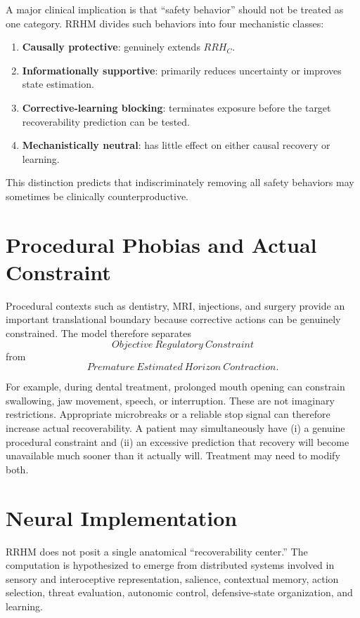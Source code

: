 \documentclass[11pt]{article}
\begin{document}
A major clinical implication is that ``safety behavior'' should not be treated as one category. RRHM divides such behaviors into four mechanistic classes:

\begin{enumerate}[label=\arabic*.]
\item \textbf{Causally protective}: genuinely extends $RRH_C$.
\item \textbf{Informationally supportive}: primarily reduces uncertainty or improves state estimation.
\item \textbf{Corrective-learning blocking}: terminates exposure before the target recoverability prediction can be tested.
\item \textbf{Mechanistically neutral}: has little effect on either causal recovery or learning.
\end{enumerate}

This distinction predicts that indiscriminately removing all safety behaviors may sometimes be clinically counterproductive.

\section{Procedural Phobias and Actual Constraint}

Procedural contexts such as dentistry, MRI, injections, and surgery provide an important translational boundary because corrective actions can be genuinely constrained. The model therefore separates
\[
Objective\ Regulatory\ Constraint
\]
from
\[
Premature\ Estimated\ Horizon\ Contraction.
\]

For example, during dental treatment, prolonged mouth opening can constrain swallowing, jaw movement, speech, or interruption. These are not imaginary restrictions. Appropriate microbreaks or a reliable stop signal can therefore increase actual recoverability. A patient may simultaneously have (i) a genuine procedural constraint and (ii) an excessive prediction that recovery will become unavailable much sooner than it actually will. Treatment may need to modify both.

\section{Neural Implementation}

RRHM does not posit a single anatomical ``recoverability center.'' The computation is hypothesized to emerge from distributed systems involved in sensory and interoceptive representation, salience, contextual memory, action selection, threat evaluation, autonomic control, defensive-state organization, and learning.
\end{document}
